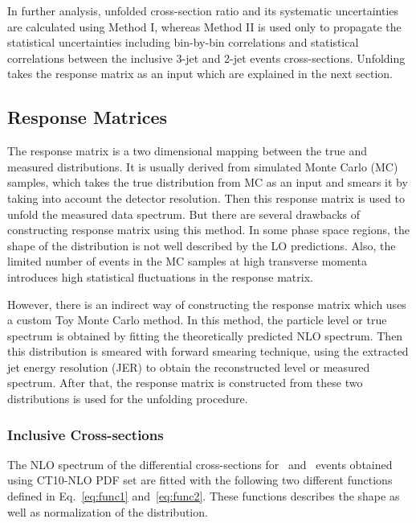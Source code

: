 In further analysis, unfolded cross-section ratio \ratio and its systematic uncertainties are calculated using Method I, whereas Method II is used only to propagate the statistical uncertainties including bin-by-bin correlations and statistical correlations between the inclusive 3-jet and 2-jet events cross-sections. Unfolding takes the response matrix as an input which are explained in the next section.

\subsection{Response Matrices}
\label{sec:funcs}
The response matrix is a two dimensional mapping between the true and measured distributions. It is usually derived from simulated Monte Carlo (MC) samples, which takes the true distribution from MC as an input and smears it by taking into account the detector resolution. Then this response matrix is used to unfold the measured data spectrum. But there are several drawbacks of constructing response matrix using this method. In some phase space regions, the shape of the distribution is not well described by the LO predictions. Also, the limited number of events in the MC samples at high transverse momenta introduces high statistical fluctuations in the response matrix. 

However, there is an indirect way of constructing the response matrix which uses a custom Toy Monte Carlo method. In this method, the particle level or true \httwo spectrum is obtained by fitting the theoretically predicted NLO spectrum. Then this distribution is smeared with forward smearing technique, using the extracted jet energy resolution (JER) to obtain the reconstructed level or measured \httwo spectrum. After that, the response matrix is constructed from these two distributions is used for the unfolding procedure. 

\subsubsection{Inclusive Cross-sections}
\label{sec:cross_sec_res}
The NLO spectrum of the differential cross-sections for \njt~and \njth~events obtained using CT10-NLO PDF set are fitted with the following two different functions defined in Eq.~\ref{eq:func1} and~\ref{eq:func2}. These functions describes the shape as well as normalization of the distribution.

